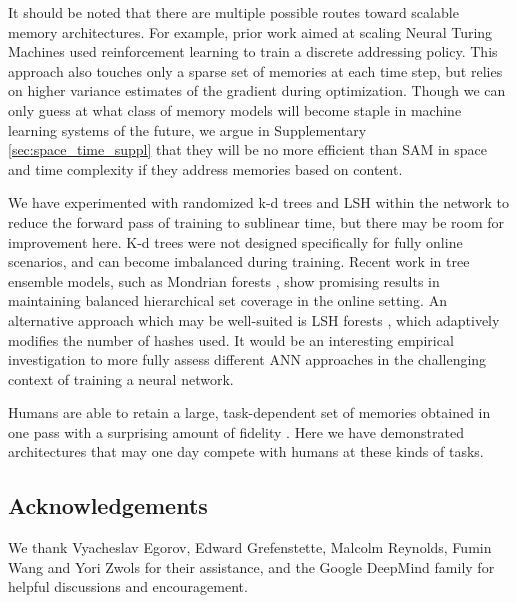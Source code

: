 \documentclass{article}
\begin{document}
It should be noted that there are multiple possible routes toward scalable memory architectures. For example, prior work aimed at scaling Neural Turing Machines \cite{zaremba2015reinforcement} used reinforcement learning to train a discrete addressing policy. This approach also touches only a sparse set of memories at each time step, but relies on higher variance estimates of the gradient during optimization. Though we can only guess at what class of memory models will become staple in machine learning systems of the future, we argue in Supplementary \ref{sec:space_time_suppl} that they will be no more efficient than SAM in space and time complexity if they address memories based on content.








We have experimented with randomized k-d trees and LSH within the network to reduce the forward pass of training to sublinear time, but there may be room for improvement here. K-d trees were not designed specifically for fully online scenarios, and can become imbalanced during training. Recent work in tree ensemble models, such as Mondrian forests \cite{lakshminarayanan2014mondrian}, show promising results in maintaining balanced hierarchical set coverage in the online setting. An alternative approach which may be well-suited is LSH forests \cite{bawa2005lsh}, which adaptively modifies the number of hashes used. It would be an interesting empirical investigation to more fully assess different ANN approaches in the challenging context of training a neural network.

Humans are able to retain a large, task-dependent set of memories obtained in one pass with a surprising amount of fidelity \cite{brady2008visual}. Here we have demonstrated architectures that may one day compete with humans at these kinds of tasks.

















\subsection*{Acknowledgements}
We thank Vyacheslav Egorov, Edward Grefenstette, Malcolm Reynolds, Fumin Wang and Yori Zwols for their assistance, and the Google DeepMind family for helpful discussions and encouragement.
\end{document}
